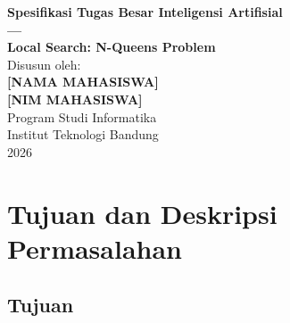 \documentclass[12pt,a4paper]{article}
\begin{document}
\begin{titlepage}
    \centering
    \vspace*{2cm}

    {\LARGE \textbf{Spesifikasi Tugas Besar Inteligensi Artifisial}}\\[0.5cm]
    {\LARGE \textbf{---}}\\[0.5cm]
    {\LARGE \textbf{Local Search: N-Queens Problem}}\\[3cm]

    {\large Disusun oleh:}\\[0.8cm]
    {\Large \textbf{[NAMA MAHASISWA]}}\\[0.4cm]
    {\Large \textbf{[NIM MAHASISWA]}}\\[4cm]

    {\large Program Studi Informatika}\\[0.3cm]
    {\large Institut Teknologi Bandung}\\[0.3cm]
    {\large 2026}

    \vfill
\end{titlepage}

\newpage

\tableofcontents
\newpage


\vspace{1em}

\section{Tujuan dan Deskripsi Permasalahan}
\label{sec:tujuan}

\subsection{Tujuan}
\label{subsec:tujuan}
\end{document}
